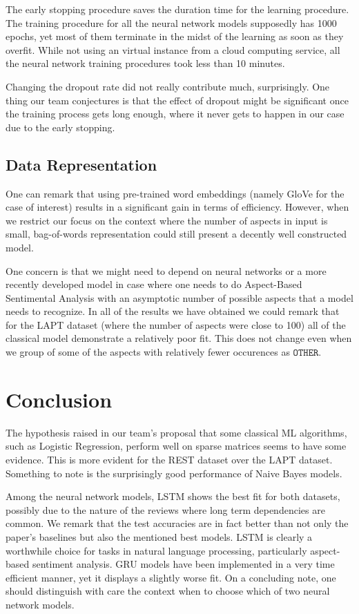 \documentclass[comsoc,conference]{IEEEtran}
\begin{document}
The early stopping procedure saves the duration time for the learning procedure. The training procedure for all the neural network models supposedly has 1000 epochs, yet most of them terminate in the midst of the learning as soon as they overfit. While not using an virtual instance from a cloud computing service, all the neural network training procedures took less than 10 minutes. 

Changing the dropout rate did not really contribute much, surprisingly. One thing our team conjectures is that the effect of dropout might be significant once the training process gets long enough, where it never gets to happen in our case due to the early stopping.

\subsection{Data Representation}

One can remark that using pre-trained word embeddings (namely GloVe for the case of interest) results in a significant gain in terms of efficiency. However, when we restrict our focus on the context where the number of aspects in input is small, bag-of-words representation could still present a decently well constructed model.

One concern is that we might need to depend on neural networks or a more recently developed model in case where one needs to do Aspect-Based Sentimental Analysis with an asymptotic number of possible aspects that a model needs to recognize. In all of the results we have obtained we could remark that for the LAPT dataset (where the number of aspects were close to 100) all of the classical model demonstrate a relatively poor fit. This does not change even when we group of some of the aspects with relatively fewer occurences as $\texttt{OTHER}$. 

\section{Conclusion}

The hypothesis raised in our team's proposal that some classical ML algorithms, such as Logistic Regression, perform well on sparse matrices seems to have some evidence. This is more evident for the REST dataset over the LAPT dataset. Something to note is the surprisingly good performance of Naive Bayes models. 

Among the neural network models, LSTM shows the best fit for both datasets, possibly due to the nature of the reviews where long term dependencies are common. We remark that the test accuracies are in fact better than not only the paper's baselines but also the mentioned best models. LSTM is clearly a worthwhile choice for tasks in natural language processing, particularly aspect-based sentiment analysis. GRU models have been implemented in a very time efficient manner, yet it displays a slightly worse fit. On a concluding note, one should distinguish with care the context when to choose which of two neural network models.
\end{document}
